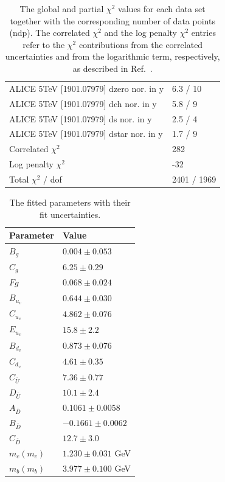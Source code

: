 \documentclass[12pt]{article}
\begin{document}
\begin{table}
\begin{tabular}{ll}
    ALICE 5TeV [1901.07979] dzero nor. in y & 6.3 / 10  \\ 
    ALICE 5TeV [1901.07979] dch nor. in y & 5.8 / 9  \\ 
    ALICE 5TeV [1901.07979] ds nor. in y & 2.5 / 4  \\ 
    ALICE 5TeV [1901.07979] dstar nor. in y & 1.7 / 9  \\ 
    \hline
    Correlated $\chi^2$  & 282  \\ 
    Log penalty $\chi^2$  &  -32  \\ 
    \hline
    Total $\chi^2$ / dof  & 2401 / 1969  \\ 
\end{tabular}
\caption{The global and partial $\chi^2$ values for each data set together with the corresponding number of data points (ndp). The correlated $\chi^2$ and the log penalty $\chi^2$ entries refer to the $\chi^2$ contributions from the correlated uncertainties and from the logarithmic term, respectively, as described in Ref.~\cite{Abramowicz:2015mha}.}
\label{tab:chi}
\end{table}

\begin{table}
    \renewcommand*{\arraystretch}{1.12}
    \centering
\begin{tabular}{ll}
    Parameter & Value \\
    \hline
    $B_g$ & $0.004 \pm 0.053$  \\
    $C_g$ & $6.25 \pm 0.29$  \\
    $Fg$ & $0.068 \pm 0.024$  \\
    $B_{u_v}$ & $0.644 \pm 0.030$  \\
    $C_{u_v}$ & $4.862 \pm 0.076$  \\
    $E_{u_v}$ & $15.8 \pm 2.2$  \\
    $B_{d_v}$ & $0.873 \pm 0.076$  \\
    $C_{d_v}$ & $4.61 \pm 0.35$  \\
    $C_{\overline{U}}$ & $7.36 \pm 0.77$  \\
    $D_{\overline{U}}$ & $10.1 \pm 2.4$  \\
    $A_{\overline{D}}$ & $0.1061 \pm 0.0058$  \\
    $B_{\overline{D}}$ & $-0.1661 \pm 0.0062$  \\
    $C_{\overline{D}}$ & $12.7 \pm 3.0$  \\
    $m_c(m_c)$ & $1.230 \pm 0.031$ GeV  \\
    $m_b(m_b)$ & $3.977 \pm 0.100$ GeV  \\
\end{tabular}
\caption{The fitted parameters with their fit uncertainties.}
\label{tab:pars}
\end{table}
\end{document}
